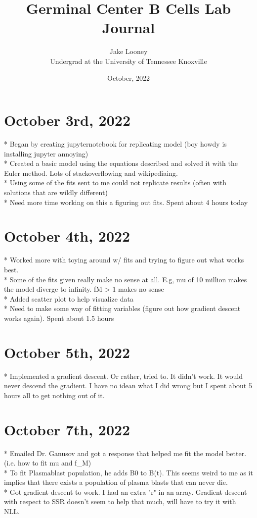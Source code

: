 \documentclass[letterpaper,12pt]{article}
\begin{document}
\title{Germinal Center B Cells Lab Journal}
\author{Jake Looney\\ Undergrad at the University of Tennessee Knoxville}
\date{October, 2022}
\maketitle

\tableofcontents
\newpage
{}

\section{October 3rd, 2022}
* Began by creating jupyternotebook for replicating model (boy howdy is installing jupyter annoying)
\\
* Created a basic model using the equations described and solved it with the Euler method. Lots of stackoverflowing and wikipediaing.
\\
* Using some of the fits sent to me could not replicate results (often with solutions that are wildly different)
\\
* Need more time working on this a figuring out fits. Spent about 4 hours today

\section{October 4th, 2022}
* Worked more with toying around w/ fits and trying to figure out what works best. 
\\
* Some of the fits given really make no sense at all. E.g, mu of 10 million makes the model diverge to infinity. fM > 1 makes no sense
\\
* Added scatter plot to help visualize data
\\
* Need to make some way of fitting variables (figure out how gradient descent works again). Spent about 1.5 hours

\section{October 5th, 2022}
* Implemented a gradient descent. Or rather, tried to. It didn't work. It would never descend the gradient. 
I have no idean what I did wrong but I spent about 5 hours all to get nothing out of it.

\section{October 7th, 2022}
* Emailed Dr. Ganusov and got a response that helped me fit the model better. (i.e. how to fit mu and f_M)
\\
* To fit Plasmablast population, he adds B0 to B(t). This seems weird to me as it implies that there exists a population of plasma blasts that can never die.
\\
* Got gradient descent to work. I had an extra "r" in an array. Gradient descent with respect to SSR doesn't seem to help that much, will have to try it with NLL.
\end{document}
